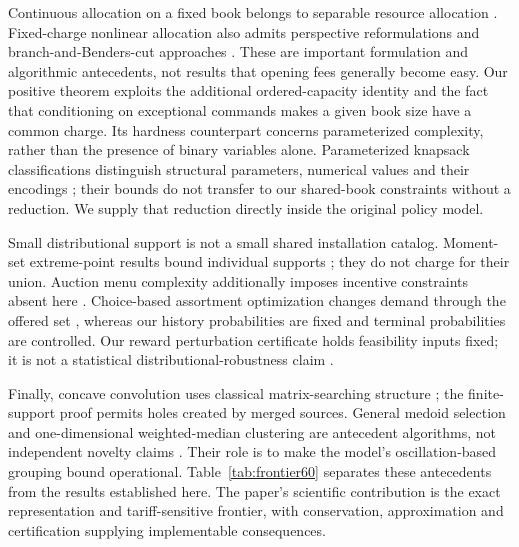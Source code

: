Continuous allocation on a fixed book belongs to separable resource allocation \citep{Patriksson2008}. Fixed-charge nonlinear allocation also admits perspective reformulations and branch-and-Benders-cut approaches \citep{Yang2025}. These are important formulation and algorithmic antecedents, not results that opening fees generally become easy. Our positive theorem exploits the additional ordered-capacity identity and the fact that conditioning on exceptional commands makes a given book size have a common charge. Its hardness counterpart concerns parameterized complexity, rather than the presence of binary variables alone. Parameterized knapsack classifications distinguish structural parameters, numerical values and their encodings \citep{Gurski2019}; their bounds do not transfer to our shared-book constraints without a reduction. We supply that reduction directly inside the original policy model.

Small distributional support is not a small shared installation catalog. Moment-set extreme-point results bound individual supports \citep{Winkler1988}; they do not charge for their union. Auction menu complexity additionally imposes incentive constraints absent here \citep{HartNisan2013,Babaioff2016}. Choice-based assortment optimization changes demand through the offered set \citep{Rusmevichientong2010}, whereas our history probabilities are fixed and terminal probabilities are controlled. Our reward perturbation certificate holds feasibility inputs fixed; it is not a statistical distributional-robustness claim \citep{EsfahaniKuhn2018}.

Finally, concave convolution uses classical matrix-searching structure \citep{Aggarwal1987}; the finite-support proof permits holes created by merged sources. General medoid selection and one-dimensional weighted-median clustering are antecedent algorithms, not independent novelty claims \citep{Arya2004,Wu1991}. Their role is to make the model's oscillation-based grouping bound operational. Table~\ref{tab:frontier60} separates these antecedents from the results established here. The paper's scientific contribution is the exact representation and tariff-sensitive frontier, with conservation, approximation and certification supplying implementable consequences.
